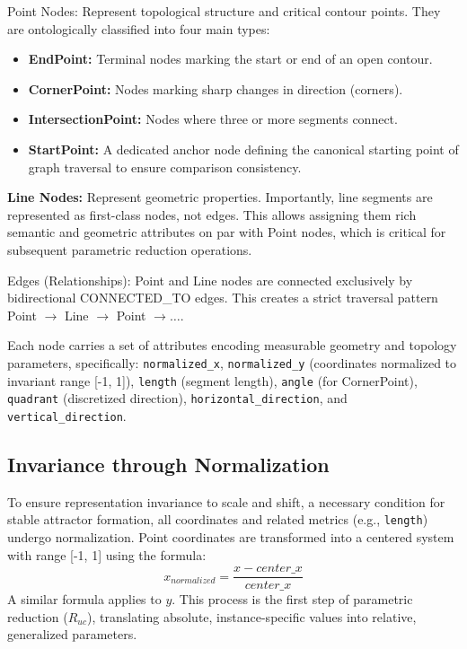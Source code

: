 \documentclass[conference]{IEEEtran}
\begin{document}
Point Nodes: Represent topological structure and critical contour points. They are ontologically classified into four main types:
\begin{itemize}
    \item \textbf{EndPoint:} Terminal nodes marking the start or end of an open contour.
    \item \textbf{CornerPoint:} Nodes marking sharp changes in direction (corners).
    \item \textbf{IntersectionPoint:} Nodes where three or more segments connect.
    \item \textbf{StartPoint:} A dedicated anchor node defining the canonical starting point of graph traversal to ensure comparison consistency.
\end{itemize}

\textbf{Line Nodes:} Represent geometric properties. Importantly, line segments are represented as first-class nodes, not edges. This allows assigning them rich semantic and geometric attributes on par with Point nodes, which is critical for subsequent parametric reduction operations.

Edges (Relationships): Point and Line nodes are connected exclusively by bidirectional CONNECTED\_TO edges. This creates a strict traversal pattern Point $\rightarrow$ Line $\rightarrow$ Point $\rightarrow \dots$.

Each node carries a set of attributes encoding measurable geometry and topology parameters, specifically: \texttt{normalized\_x}, \texttt{normalized\_y} (coordinates normalized to invariant range [-1, 1]), \texttt{length} (segment length), \texttt{angle} (for CornerPoint), \texttt{quadrant} (discretized direction), \texttt{horizontal\_direction}, and \texttt{vertical\_direction}.

\subsection{Invariance through Normalization}
To ensure representation invariance to scale and shift, a necessary condition for stable attractor formation, all coordinates and related metrics (e.g., \texttt{length}) undergo normalization. Point coordinates are transformed into a centered system with range [-1, 1] using the formula:
\[
x_{normalized} = \frac{x - center\_x}{center\_x}
\]
A similar formula applies to $y$. This process is the first step of parametric reduction ($R_{uc}$), translating absolute, instance-specific values into relative, generalized parameters.
\end{document}
